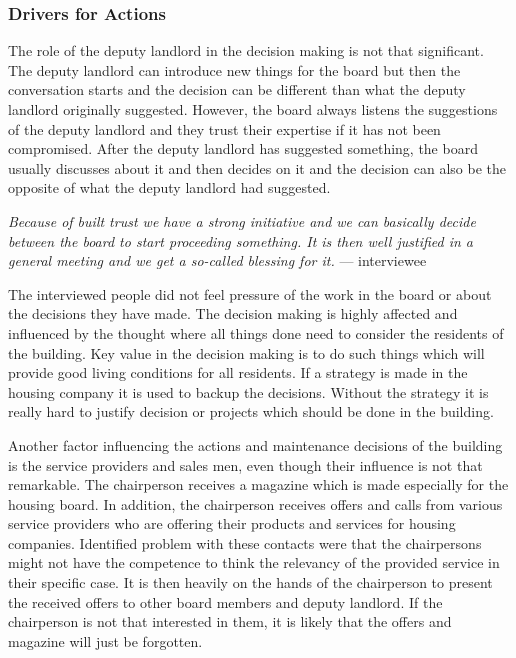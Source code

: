 \subsubsection*{Drivers for Actions}

The role of the deputy landlord in the decision making is not that significant. The deputy landlord can introduce new things for the board but then the conversation starts and the decision can be different than what the deputy landlord originally suggested. However, the board always listens the suggestions of the deputy landlord and they trust their expertise if it has not been compromised. After the deputy landlord has suggested something, the board usually discusses about it and then decides on it and the decision can also be the opposite of what the deputy landlord had suggested.

\begin{displayquote}
\textit{Because of built trust we have a strong initiative and we can basically decide between the board to start proceeding something. It is then well justified in a general meeting and we get a so-called blessing for it.} --- interviewee
\end{displayquote}

The interviewed people did not feel pressure of the work in the board or about the decisions they have made. The decision making is highly affected and influenced by the thought where all things done need to consider the residents of the building. Key value in the decision making is to do such things which will provide good living conditions for all residents. If a strategy is made in the housing company it is used to backup the decisions. Without the strategy it is really hard to justify decision or projects which should be done in the building.

Another factor influencing the actions and maintenance decisions of the building is the service providers and sales men, even though their influence is not that remarkable. The chairperson receives a magazine which is made especially for the housing board. In addition, the chairperson receives offers and calls from various service providers who are offering their products and services for housing companies. Identified problem with these contacts were that the chairpersons might not have the competence to think the relevancy of the provided service in their specific case. It is then heavily on the hands of the chairperson to present the received offers to other board members and deputy landlord. If the chairperson is not that interested in them, it is likely that the offers and magazine will just be forgotten.

